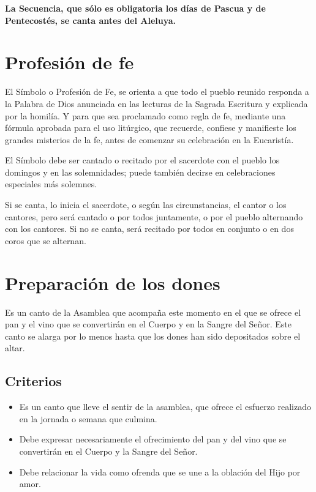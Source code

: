 \documentclass[letterpaper, 12pt]{book}
\begin{document}
    \textbf{La Secuencia, que s\'olo es obligatoria los d\'ias de Pascua y de Pentecost\'es, se canta antes del Aleluya.}
    
    \section{Profesi\'on de fe}
    El S\'imbolo o Profesi\'on de Fe, se orienta a que todo el pueblo reunido responda a la Palabra de Dios anunciada en las lecturas de la Sagrada Escritura y explicada por la homil\'ia. Y para que sea proclamado como regla de fe, mediante una f\'ormula aprobada para el uso lit\'urgico, que recuerde, confiese y manifieste los grandes misterios de la fe, antes de comenzar su celebración en la Eucarist\'ia.\newline
    
    El S\'imbolo debe ser cantado o recitado por el sacerdote con el pueblo los domingos y en las solemnidades; puede tambi\'en decirse en celebraciones especiales m\'as solemnes.\newline
    
    Si se canta, lo inicia el sacerdote, o seg\'un las circunstancias, el cantor o los cantores, pero ser\'a cantado o por todos juntamente, o por el pueblo alternando con los cantores. Si no se canta, ser\'a recitado por todos en conjunto o en dos coros que se alternan.
    
    \section{Preparaci\'on de los dones}
    Es un canto de la Asamblea que acompa\~na este momento en el que se ofrece el pan y el vino que se convertir\'an en el Cuerpo y en la Sangre del Se\~nor. Este canto se alarga por lo menos hasta que los dones han sido depositados sobre el altar.

    \subsection{Criterios}
    
    \begin{itemize}
        \item Es un canto que lleve el sentir de la asamblea, que ofrece el esfuerzo realizado en la jornada o semana que culmina.
        \item Debe expresar necesariamente el ofrecimiento del pan y del vino que se convertir\'an en el Cuerpo y la Sangre del Se\~nor.
        \item Debe relacionar la vida como ofrenda que se une a la oblaci\'on del Hijo por amor.
    \end{itemize}
\end{document}
